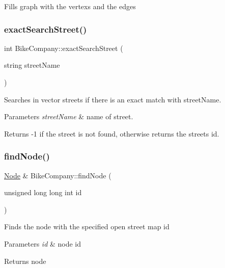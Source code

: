 Fills graph with the vertexs and the edges \mbox{\label{class_bike_company_a7c844e84c41eff544d58c6b964dcacf7}} 
\subsubsection{\texorpdfstring{exact\+Search\+Street()}{exactSearchStreet()}}
{\footnotesize\ttfamily int Bike\+Company\+::exact\+Search\+Street (\begin{DoxyParamCaption}\item[{string}]{street\+Name }\end{DoxyParamCaption})}

Searches in vector \textquotesingle{}streets\textquotesingle{} if there is an exact match with street\+Name. 
\begin{DoxyParams}{Parameters}
{\em street\+Name} & name of street. \\
\hline
\end{DoxyParams}
\begin{DoxyReturn}{Returns}
-\/1 if the street is not found, otherwise returns the street\textquotesingle{}s id. 
\end{DoxyReturn}
\mbox{\label{class_bike_company_ac3a38462c549de8c3c58c83c5e6f6696}} 
\subsubsection{\texorpdfstring{find\+Node()}{findNode()}}
{\footnotesize\ttfamily \mbox{\hyperlink{class_node}{Node}} \& Bike\+Company\+::find\+Node (\begin{DoxyParamCaption}\item[{unsigned long long int}]{id }\end{DoxyParamCaption})}

Finds the node with the specified open street map id 
\begin{DoxyParams}{Parameters}
{\em id} & node id \\
\hline
\end{DoxyParams}
\begin{DoxyReturn}{Returns}
node 
\end{DoxyReturn}
\mbox{\label{class_bike_company_a7adfcf36f3e55f8c3498c4b304a3d4dc}} 
